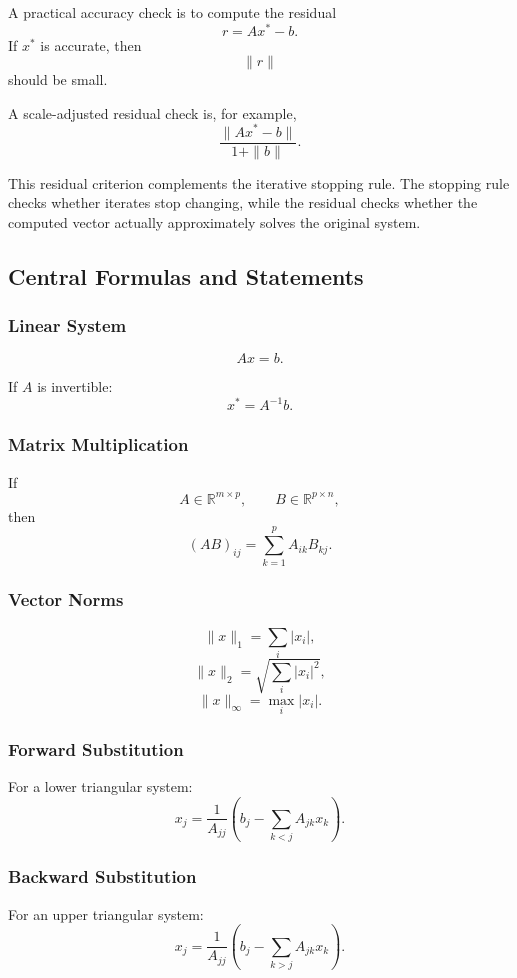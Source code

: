 \documentclass[10pt, letterpaper]{article}
\newcommand{\R}{\mathbb{R}}
\begin{document}
A practical accuracy check is to compute the residual
\[
r=Ax^\ast-b.
\]
If \(x^\ast\) is accurate, then
\[
\|r\|
\]
should be small.

A scale-adjusted residual check is, for example,
\[
\frac{\|Ax^\ast-b\|}{1+\|b\|}.
\]

This residual criterion complements the iterative stopping rule. The stopping rule checks whether iterates stop changing, while the residual checks whether the computed vector actually approximately solves the original system.

\subsection{Central Formulas and Statements}

\subsubsection{Linear System}

\[
Ax=b.
\]

If \(A\) is invertible:
\[
x^\ast=A^{-1}b.
\]

\subsubsection{Matrix Multiplication}

If
\[
A\in\R^{m\times p},
\qquad
B\in\R^{p\times n},
\]
then
\[
(AB)_{ij}
=
\sum_{k=1}^{p}A_{ik}B_{kj}.
\]

\subsubsection{Vector Norms}

\[
\|x\|_1=\sum_i |x_i|,
\]
\[
\|x\|_2=\sqrt{\sum_i |x_i|^2},
\]
\[
\|x\|_\infty=\max_i |x_i|.
\]

\subsubsection{Forward Substitution}

For a lower triangular system:
\[
x_j
=
\frac{1}{A_{jj}}
\left(
b_j-\sum_{k<j}A_{jk}x_k
\right).
\]

\subsubsection{Backward Substitution}

For an upper triangular system:
\[
x_j
=
\frac{1}{A_{jj}}
\left(
b_j-\sum_{k>j}A_{jk}x_k
\right).
\]
\end{document}

